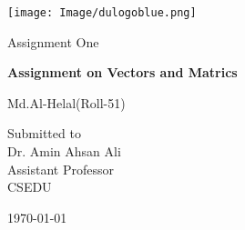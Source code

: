 \documentclass[12pt,a4paper]{report}
\begin{document}
\begin{titlepage}
\centering
\texttt{[image: Image/dulogoblue.png]}\\
\vspace{2cm}
{\Large Assignment One\par}
\vspace{2cm}
{\huge\bfseries Assignment on Vectors and Matrics\par}
\vspace{2cm}
{\Large Md.Al-Helal(Roll-51)\par}
\vfill
Submitted to\\
\vspace{0.5cm}
Dr. Amin Ahsan Ali \\ Assistant Professor\\CSEDU
\vfill
{\large \today\par}
\end{titlepage}
\end{document}
